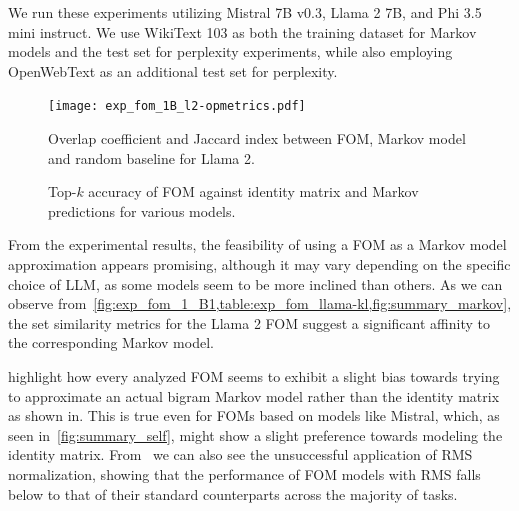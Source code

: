 \documentclass[11pt,a4paper,twocolumn]{article}
\begin{document}
We run these experiments utilizing Mistral 7B v0.3, Llama 2 7B, and Phi 3.5 mini instruct.
We use WikiText 103 as both the training dataset for Markov models and the test set for perplexity experiments, while also employing OpenWebText as an additional test set for perplexity.

\begin{figure}[tbh!]
    \centering
    \texttt{[image: exp\_fom\_1B\_l2-opmetrics.pdf]}
    \caption[Overlap coefficient and Jaccard index for Llama 2.]{Overlap coefficient and Jaccard index between FOM, Markov model and random baseline for Llama 2.}
    \label{fig:exp_fom_1_B1}
    \vspace{-10pt}
\end{figure}

\begin{figure}[tbh!]
    \vspace{-10pt}
    \centering
    \caption{Top-$k$ accuracy of FOM against identity matrix and Markov predictions for various models.}
    \label{fig:summary_topk}
\end{figure}

From the experimental results, the feasibility of using a FOM as a Markov model approximation appears promising, although it may vary depending on the specific choice of LLM, as some models seem to be more inclined than others.
As we can observe from~\cref{fig:exp_fom_1_B1,table:exp_fom_llama-kl,fig:summary_markov}, the set similarity metrics for the Llama 2 FOM suggest a significant affinity to the corresponding Markov model.

 highlight how every analyzed FOM seems to exhibit a slight bias towards trying to approximate an actual bigram Markov model rather than the identity matrix as shown in.
This is true even for FOMs based on models like Mistral, which, as seen in~\cref{fig:summary_self}, might show a slight preference towards modeling the identity matrix.
From~ we can also see the unsuccessful application of RMS normalization, showing that the performance of FOM models with RMS falls below to that of their standard counterparts across the majority of tasks.
\end{document}

